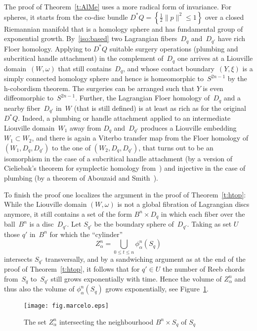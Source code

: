 \documentclass[12pt,twoside]{amsart}
\theoremstyle{plain}
\numberwithin{figure}{section}
\numberwithin{equation}{section}
\def\ga{\alpha}
\def\go{\omega}
\begin{document}
The proof of Theorem~\ref{t:AlMe} uses a more radical form of invariance.
For spheres, 
it starts from the co-disc bundle $D^*Q = \left\{ \frac 12 \|p\|^2 \leqslant 1 \right\}$ 
over a closed Riemannian manifold that is a homology sphere and has fundamental group of exponential growth. 
By~\eqref{iso:based} two Lagrangian fibers~$D_q$ and~$D_{q'}$ 
have rich Floer homology.
Applying to $D^*Q$ suitable surgery operations (plumbing and subcritical handle attachment) 
in the complement of~$D_q$
one arrives at a Liouville domain~$(W,\go)$ that still contains~$D_q$,
and whose contact boundary~$(Y,\xi)$ is a simply connected homology sphere 
and hence is homeomorphic to~$S^{2n-1}$ by the h-cobordism theorem.
The surgeries can be arranged such that $Y$ is even diffeomorphic to~$S^{2n-1}$.
%
Further, the Lagrangian Floer homology of~$D_q$ and a nearby fiber~$D_{q'}$ in~$W$ 
(that is still defined) is at least as rich as for the original~$D^*Q$.
Indeed,
a plumbing or handle attachment applied to an intermediate Liouville domain~$W_1$
away from $D_q$ and~$D_{q'}$ produces a Liouville embedding $W_1 \subset W_2$,
and there is again a Viterbo transfer map from the Floer homology 
of $(W_1,D_q,D_{q'})$ to the one of $(W_2,D_q,D_{q'})$,
that turns out to be an isomorphism in the case of a subcritical handle attachment 
(by a version of Cieliebak's theorem for symplectic homology from~\cite{cie02})
and injective in the case of plumbing
(by a theorem of Abouzaid and Smith~\cite{AbSm12}).

To finish the proof one localizes the argument in the proof of Theorem~\ref{t:htop}:
While the Liouville domain $(W,\omega)$ is not a global fibration of Lagrangian discs anymore, 
it still contains a set of the form $B^n \times D_q$ in which each fiber over the
ball~$B^n$ is a disc~$D_{q'}$.
Let $S_{q'}$ be the boundary sphere of~$D_{q'}$.
Taking as set $U$ those $q'$ in~$B^n$ for which the ``cylinder''
$$
Z_\ga^n = \bigcup_{0 \leqslant t \leqslant n} \phi_\ga^n (S_q)
$$ 
intersects $S_{q'}$ transversally,
and by a sandwiching argument as at the end of the proof of Theorem~\ref{t:htop},
it follows that for $q' \in U$ the number of Reeb chords from~$S_q$ to~$S_{q'}$ 
still grows exponentially with time. 
Hence the volume of $Z_\ga^n$ 
and thus also the volume of $\phi_\ga^n (S_q)$
grows exponentially, see Figure~\ref{fig.marcelo}.

%
\begin{figure}[h]  
 \begin{center}
  \psfrag{f}{$\phi_\ga^n(S_q)$}
  \leavevmode\texttt{[image: fig.marcelo.eps]}
 \end{center}
 \caption{The set $Z_\ga^n$ intersecting the neighbourhood $B^n \times S_q$ of $S_q$} 
 \label{fig.marcelo}
\end{figure}
%
\end{document}
